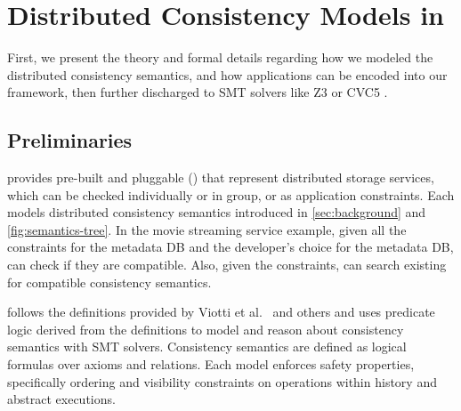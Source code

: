 \section{Distributed Consistency Models in \sysname{}}
\label{sec:design}

First, we present the theory and formal details regarding how we modeled
the distributed consistency semantics, and how applications can be
encoded into our \sysname{} framework, then further discharged to
SMT solvers like Z3 \cite{demoura2008z3} or CVC5 \cite{barbosa2022cvc5}.

\subsection{Preliminaries}

\sysname{} provides pre-built and pluggable \sysmodlongs{} (\sysmods{})
that represent distributed storage services, which can be checked individually or in group,
or as application constraints.
Each \sysmod{} models distributed consistency semantics introduced in
\cref{sec:background} and \cref{fig:semantics-tree}.
In the movie streaming service example, given all the constraints for the
metadata DB and the developer's \sysmod{} choice for the metadata DB,
\sysname{} can check if they are compatible. Also, given the constraints,
\sysname{} can search existing \sysmods{} for compatible
consistency semantics.

\sysname{} follows the definitions provided by
Viotti et al.~\cite{viotti2016consistency} and others
\cite{terry1994session, baldoni2002an, burckhardt2014principles}
and uses predicate logic derived from the definitions to
model \sysmods{} and reason about consistency semantics with SMT solvers.
Consistency semantics are defined as logical formulas over axioms and
relations. Each model enforces safety properties, specifically ordering and
visibility constraints on operations within history and abstract
executions.

